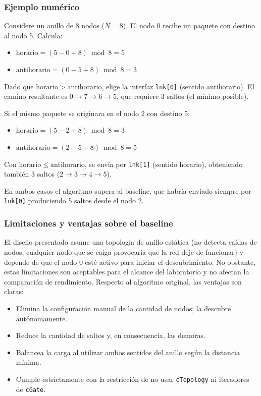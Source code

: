\documentclass[10pt,letterpaper,twocolumn]{article}
\begin{document}
\subsubsection*{Ejemplo numérico}

Considere un anillo de 8 nodos (\(N=8\)). El nodo 0 recibe un paquete con
destino al nodo 5. Calcula:

\begin{itemize}
    \item \(\mathrm{horario} = (5 - 0 + 8) \bmod 8 = 5\)

    \item \(\mathrm{antihorario} = (0 - 5 + 8) \bmod 8 = 3\)
\end{itemize}

Dado que \(\mathrm{horario} > \mathrm{antihorario}\), elige la interfaz
\texttt{lnk[0]} (sentido antihorario). El camino resultante es
\(0 \rightarrow 7 \rightarrow 6 \rightarrow 5\), que requiere 3 saltos
(el mínimo posible).

Si el mismo paquete se originara en el nodo 2 con destino 5:

\begin{itemize}
    \item \(\mathrm{horario} = (5 - 2 + 8) \bmod 8 = 3\)

    \item \(\mathrm{antihorario} = (2 - 5 + 8) \bmod 8 = 5\)
\end{itemize}

Con \(\mathrm{horario} \leq \mathrm{antihorario}\), se envía por
\texttt{lnk[1]} (sentido horario), obteniendo también 3 saltos
(\(2 \rightarrow 3 \rightarrow 4 \rightarrow 5\)).

En ambos casos el algoritmo supera al baseline, que habría enviado siempre
por \texttt{lnk[0]} produciendo 5 saltos desde el nodo 2.

\subsubsection*{Limitaciones y ventajas sobre el baseline}

El diseño presentado asume una topología de anillo estática (no detecta caídas de
nodos, cualquier nodo que se caiga provocaria que la red deje de funcionar) y 
depende de que el nodo 0 esté activo para iniciar el descubrimiento. No
obstante, estas limitaciones son aceptables para el alcance del laboratorio y no
afectan la comparación de rendimiento. Respecto al algoritmo original, las ventajas
son claras:
\begin{itemize}
    \item Elimina la configuración manual de la cantidad de nodos; la descubre
        autónomamente.
    \item Reduce la cantidad de saltos y, en consecuencia,
        las demoras.
    \item Balancea la carga al utilizar ambos sentidos del anillo según la distancia
        mínima.
    \item Cumple estrictamente con la restricción de no usar \texttt{cTopology} ni
        iteradores de \texttt{cGate}.
\end{itemize}
\end{document}
